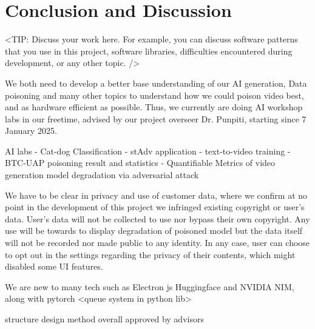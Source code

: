 \chapter{Conclusion and Discussion}
\label{chap:conclusion-discussion}

<TIP: Discuss your work here. For example, you can discuss software patterns
that you use in this project, software libraries, difficulties encountered during
development, or any other topic. />

We both need to develop a better base understanding of our AI generation, Data poisoning and many other topics to understand how we could poison video best, and as hardware efficient as possible.
Thus, we currently are doing AI workshop labs in our freetime, advised by our project overseer Dr. Punpiti, starting since 7 January 2025.

AI labs
- Cat-dog Classification
- stAdv application
- text-to-video training
- BTC-UAP poisoning result and statistics
- Quantifiable Metrics of video generation model degradation via adversarial attack

We have to be clear in privacy and use of customer data, where we confirm at no point in the development of this project we infringed existing copyright or user's data. User's data will not be collected to use nor bypass their own copyright. Any use will be towards to display degradation of poisoned model but the data itself will not be recorded nor made public to any identity. In any case, user can choose to opt out in the settings regarding the privacy of their contents, which might disabled some UI features.

We are new to many tech such as Electron js Huggingface and NVIDIA NIM, along with pytorch <queue system in python lib>

structure design method overall approved by advisors

